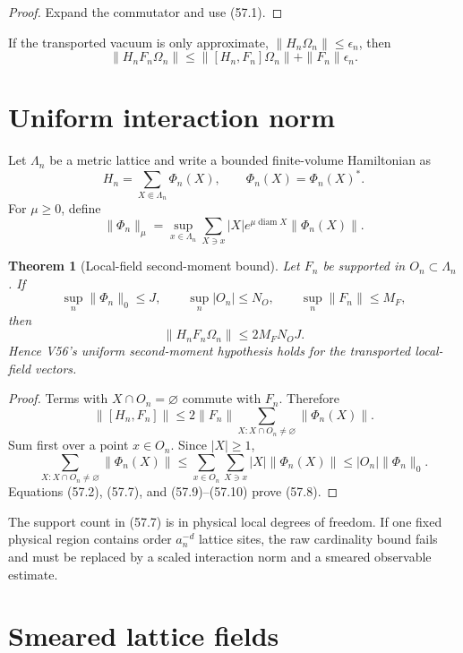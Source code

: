 \documentclass[11pt]{article}
\newtheorem{theorem}{Theorem}[section]
\theoremstyle{remark}
\begin{document}
\begin{proof}
Expand the commutator and use (57.1).
\end{proof}

If the transported vacuum is only approximate,
\(\|H_n\Omega_n\|\leq\epsilon_n\), then
\[
 \|H_nF_n\Omega_n\|
 \leq\|[H_n,F_n]\Omega_n\|+\|F_n\|\epsilon_n.            \tag{57.4}
\]

\section{Uniform interaction norm}

Let \(\Lambda_n\) be a metric lattice and write a bounded
finite-volume Hamiltonian as
\[
 H_n=\sum_{X\Subset\Lambda_n}\Phi_n(X),\qquad
 \Phi_n(X)=\Phi_n(X)^*.                                 \tag{57.5}
\]
For \(\mu\geq0\), define
\[
 \|\Phi_n\|_\mu=
 \sup_{x\in\Lambda_n}
 \sum_{X\ni x}|X|e^{\mu\operatorname{diam}X}
 \|\Phi_n(X)\|.                                         \tag{57.6}
\]

\begin{theorem}[Local-field second-moment bound]
\label{thm:v15v57-local}
Let \(F_n\) be supported in \(O_n\subset\Lambda_n\).  If
\[
 \sup_n\|\Phi_n\|_0\leq J,\qquad
 \sup_n|O_n|\leq N_O,\qquad
 \sup_n\|F_n\|\leq M_F,                                 \tag{57.7}
\]
then
\[
 \boxed{
 \|H_nF_n\Omega_n\|
 \leq2M_FN_OJ.}                                         \tag{57.8}
\]
Hence V56's uniform second-moment hypothesis holds for the
transported local-field vectors.
\end{theorem}

\begin{proof}
Terms with \(X\cap O_n=\varnothing\) commute with \(F_n\).
Therefore
\[
 \|[H_n,F_n]\|
 \leq2\|F_n\|
 \sum_{X:X\cap O_n\neq\varnothing}\|\Phi_n(X)\|.         \tag{57.9}
\]
Sum first over a point \(x\in O_n\).  Since \(|X|\geq1\),
\[
 \sum_{X:X\cap O_n\neq\varnothing}\|\Phi_n(X)\|
 \leq\sum_{x\in O_n}\sum_{X\ni x}|X|\|\Phi_n(X)\|
 \leq |O_n|\|\Phi_n\|_0.                                \tag{57.10}
\]
Equations (57.2), (57.7), and (57.9)--(57.10) prove (57.8).
\end{proof}

The support count in (57.7) is in physical local degrees of
freedom.  If one fixed physical region contains order \(a_n^{-d}\)
lattice sites, the raw cardinality bound fails and must be replaced
by a scaled interaction norm and a smeared observable estimate.

\section{Smeared lattice fields}
\end{document}

